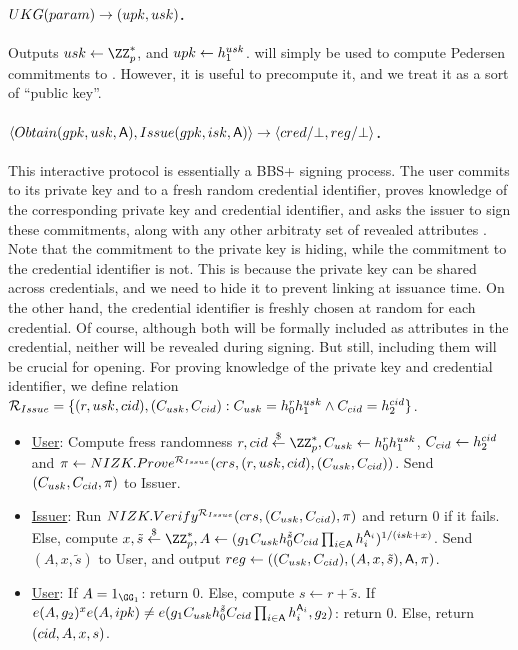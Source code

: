 \paragraph{$UKG(param) \rightarrow (upk,usk)$.} %
Outputs $\usk \gets \ZZ^*_p$, and $upk \gets h_1^{usk}$. \upk will
simply be used to compute Pedersen commitments \needcite to \usk. However,
it is useful to precompute it, and we treat it as a sort of ``public key''.

\paragraph{$\langle Obtain(gpk,usk,\mathsf{A}),Issue(gpk,isk,\mathsf{A}) \rangle
  \rightarrow \langle cred/\bot,reg/\bot \rangle$.} %
This interactive protocol is essentially a BBS+ signing  process. The user
commits to its private key and to a fresh random credential identifier, proves
knowledge of the corresponding private key and credential identifier, and
asks the issuer to sign these commitments, along with any other arbitraty set
of revealed attributes \Attrs. Note that the commitment to the private key is
hiding, while the commitment to the credential identifier is not. This is
because the private key can be shared across credentials, and we need to hide
it to prevent linking at issuance time. On the other hand, the credential
identifier is freshly chosen at random for each credential. Of course, although
both will be formally included as attributes in the credential, neither will be
revealed during signing. But still, including them will be crucial for opening.
For proving knowledge of the private key and credential identifier, we define
relation $\mathcal{R}_{Issue} = \lbrace (r, usk, cid),
(C_{usk},C_{cid}): C_{usk} = h_0^rh_1^{usk} \land C_{cid} =
h_2^{cid}\rbrace$.

\begin{itemize}
\item \underline{User}: Compute fress randomness $r,\credid \getr \ZZ^*_p,
  \Cusk \gets \gen{h}_0^r\gen{h}_1^{\usk}$, $C_{cid} \gets h_2^{cid}$
  and $\pi \gets NIZK.Prove^{\mathcal{R}_{Issue}}(crs,(r,usk,cid),
  (C_{usk},C_{cid}))$. Send $(C_{usk},C_{cid},\pi)$ to Issuer.
\item \underline{Issuer}: Run $NIZK.Verify^{\mathcal{R}_{Issue}}(crs,(C_{usk},
  C_{cid}),\pi)$ and return $0$ if it fails. Else, compute
  $x,\tilde{s} \getr \ZZ^*_p, A \gets
  (\gen{g}_1\Cusk h_0^{\tilde{s}} \Ccredid \prod_{i \in \Attrs}
  \gen{h}_i^{\Attrs_i})^{1/(\isk+x)}$.
  Send $(A,x,\tilde{s})$ to User, and output $reg \gets
  ((C_{usk},C_{cid}),(A,x,\tilde{s}),\mathsf{A},\pi)$.
\item \underline{User}: If $A = 1_{\GG_1}$: return $0$. Else, compute
  $s \gets r + \tilde{s}$. If $e(A,g_2)^xe(A,ipk) \neq
  e(g_1C_{usk}h_0^{\tilde{s}}C_{cid}\prod_{i \in \mathsf{A}}h_i^{\mathsf{A}_i},
  g_2)$: return $0$. Else, return
  $(cid,A,x,s)$.
\end{itemize}

